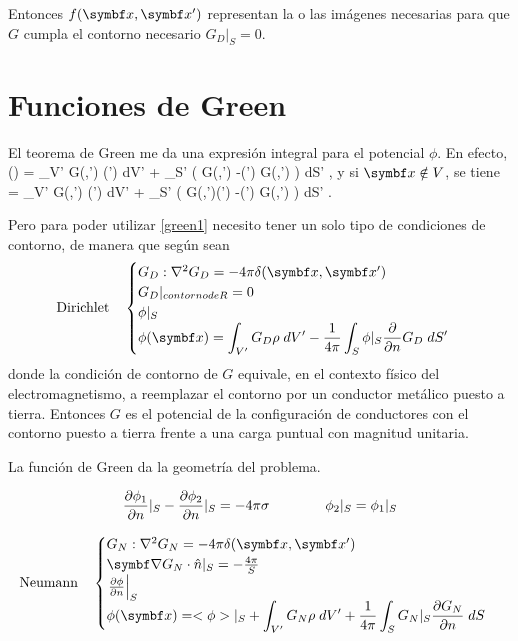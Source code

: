 \documentclass[10pt,oneside]{CBFT_book}
\begin{document}
Entonces $f( \vb{x}, \vb{x}' )$ representan la o las imágenes necesarias para que
$G$ cumpla el contorno necesario $G_D|_S=0$.


\section{Funciones de Green}

El teorema de Green me da una expresión integral para el potencial $\phi$. En efecto,
\be
	\phi() = \int_{V'} G(,') \rho(')  \; dV' +
	 \int_{S'} \left( G(,') -\phi(\vbx') G(,') \right)\; dS' ,
	\label{green1}
\ee
y si $\vbx \notin V$, se tiene
 = \int_{V'} G(,') \rho(')  \; dV' +
	 \int_{S'} \left( G(,')(\vbx') -\phi(\vbx') G(,') \right)\; dS' .
	\label{green2}
\ee

Pero para poder utilizar \eqref{green1} necesito tener un solo tipo de condiciones de contorno,
de manera que según sean
\[
	\textrm{Dirichlet} \quad 	\begin{cases}
				G_D : \lapm{G_D} = -4\pi \delta(\vb{x},\vb{x}') \\
				G_D |_{contorno de R} = 0  \\
				\phi|_S \\
				\phi(\vb{x}) = \displaystyle \int_{V'} G_D \rho \; dV' - \frac{1}{4\pi}
				\int_{S} \phi|_S\frac{\partial}{\partial n} G_D \; dS'
			\end{cases}
\]
donde la condición de contorno de $G$ equivale, en el contexto físico del electromagnetismo, a
reemplazar el contorno por un conductor metálico puesto a tierra.
Entonces $G$ es el potencial de la configuración de conductores con el contorno puesto a tierra
frente a una carga puntual con magnitud unitaria.

La función de Green da la geometría del problema.

\[
	\frac{\partial^{\hspace{-0.05em}} {\phi_1}}{\partial {n}^{\hspace{-0.05em}}}|_S - \frac{\partial^{\hspace{-0.05em}} {\phi_2}}{\partial {n}^{\hspace{-0.05em}}}|_S = -4\pi\sigma \qquad \qquad \phi_2|_S = \phi_1|_S
\]

\[
	\textrm{Neumann} \quad 	\begin{cases}
				G_N : \lapm{G_N} = -4\pi \delta(\vb{x},\vb{x}') \\
				\Nabla G_N \cdot \hat{n}|_S = -\frac{4\pi}{S}  \\
				\left.\dpar{\phi}{n}\right|_S \\
				\phi(\vb{x}) = \displaystyle <\phi>|_S + \int_{V'} G_N \rho \; dV' + 
				\frac{1}{4\pi} \int_{S} G_N|_S \dpar{G_N}{n} \; dS
			\end{cases}
\]
\end{document}
